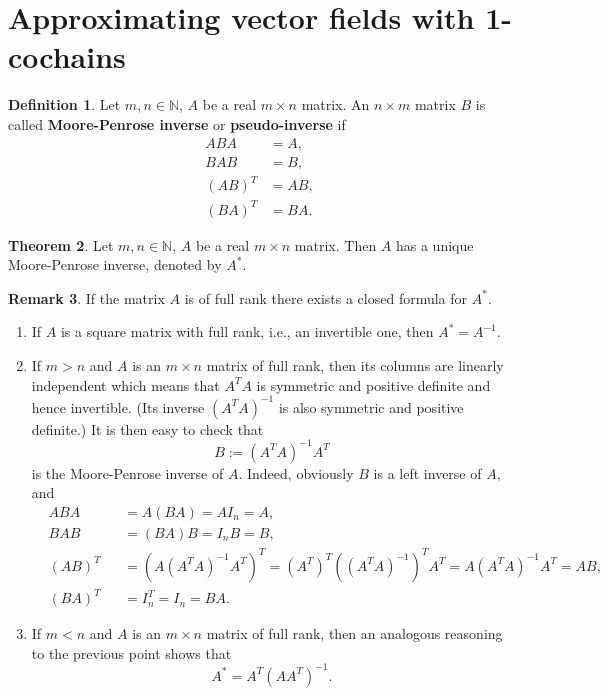 \documentclass[fleqn]{article}
\theoremstyle{definition}
\newtheorem{theorem}{Theorem}[section]
\newtheorem{definition}[theorem]{Definition}
\newtheorem{remark}[theorem]{Remark}
\newcommand{\N}{\mathbb{N}}
\begin{document}
\section{Approximating vector fields with 1-cochains}

\begin{definition}
  Let $m, n \in \N$, $A$ be a real $m \times n$ matrix.
  An $n \times m$ matrix $B$ is called \textbf{Moore-Penrose inverse} or
  \textbf{pseudo-inverse} if
  \begin{subequations}
    \begin{align}
      A B A & = A, \\
      B A B & = B, \\
      (A B)^T & = A B, \\
      (B A)^T & = B A.
    \end{align}
  \end{subequations}
\end{definition}

\begin{theorem}
  Let $m, n \in \N$, $A$ be a real $m \times n$ matrix.
  Then $A$ has a unique Moore-Penrose inverse, denoted by $A^*$.
\end{theorem}

\begin{remark}
  If the matrix $A$ is of full rank there exists a closed formula for $A^*$.
  \begin{enumerate}
    \item
      If $A$ is a square matrix with full rank, i.e., an invertible one, then
      $A^* = A^{-1}$.
    \item
      If $m > n$ and $A$ is an $m \times n$ matrix of full rank, then its
      columns are linearly independent which means that $A^T A$ is
      symmetric and positive definite and hence invertible.
      (Its inverse $(A^T A)^{-1}$ is also symmetric and positive definite.)
      It is then easy to check that
      \begin{equation}
        B := (A^T A)^{-1} A^T
      \end{equation}
      is the Moore-Penrose inverse of $A$.
      Indeed, obviously $B$ is a left inverse of $A$, and 
      \begin{subequations}
        \begin{alignat}{2}
          & A B A && = A (B A) = A I_n = A, \\
          & B A B && = (B A) B = I_n B = B, \\
          & (A B)^T && = (A (A^T A)^{-1} A^T)^T
            = (A^T)^T ((A^T A)^{-1})^T A^T = A (A^T A)^{-1} A^T = A B, \\
          & (B A)^T && = I_n^T = I_n = B A.
        \end{alignat}
      \end{subequations}
    \item
      If $m < n$ and $A$ is an $m \times n$ matrix of full rank, then an
      analogous reasoning to the previous point shows that
      \begin{equation}
        A^* = A^T (A A^T)^{-1}.
      \end{equation}
  \end{enumerate}
\end{remark}
\end{document}
